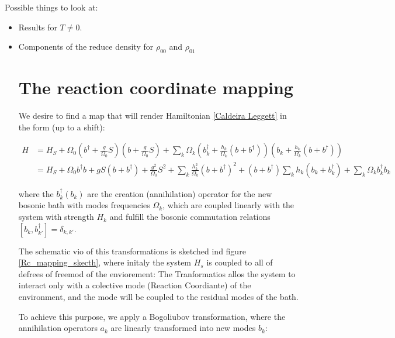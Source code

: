 \documentclass[%
preprint,
onecolumn,
notitlepag,
 amsmath,amssymb,
 aps,
 pra,
]{revtex4-2}
\begin{document}
Possible things to look at:
\begin{itemize}
\item Results for $T \neq 0$. 
\item Components of the reduce density for $\rho_{00}$ and $\rho_{01}$ 


\appendix
\section{The reaction coordinate mapping}
\label{A:RCmap}

We desire to find a map that will render Hamiltonian \eqref{Caldeira Leggett} in the form (up to a shift):

\begin{equation}
\begin{aligned}
H &=H_{S}+\Omega_{0}\left(b^{\dagger}+\frac{g}{\Omega_{0}} S\right)\left(b+\frac{g}{\Omega_{0}} S\right)+\sum_{k} \Omega_{k}\left(b_{k}^{\dagger}+\frac{h_{k}}{\Omega_{k}}\left(b+b^{\dagger}\right)\right)\left(b_{k}+\frac{h_{k}}{\Omega_{k}}\left(b+b^{\dagger}\right)\right) \\
&=H_{S}+\Omega_{0} b^{\dagger} b+g S\left(b+b^{\dagger}\right)+\frac{g^{2}}{\Omega_{0}} S^{2}+\sum_{k} \frac{h_{k}^{2}}{\Omega_{k}}\left(b+b^{\dagger}\right)^{2}+\left(b+b^{\dagger}\right) \sum_{k} h_{k}\left(b_{k}+b_{k}^{\dagger}\right)+\sum_{k} \Omega_{k} b_{k}^{\dagger} b_{k}
\end{aligned}
\label{H tranform}
\end{equation}


where  the $b_k^{\dagger} (b_k)$ are the  creation (annihilation) operator for the new bosonic bath with modes frequencies $\Omega_k$, which are coupled linearly with the  system with strength $H_k$ and fulfill the bosonic commutation relations $ [ b_k , b_{k'}^{\dagger} ] = \delta_{k,k'}  $. 

The schematic vio of this transformations is sketched ind figure \ref{Rc_mapping_skecth}, where initaly  the system $H_s$  is coupled to all of defrees of freemod of the enviorement: The Tranformatios allos the system to interact only with a colective mode (Reaction Coordiante) of the environment, and the mode will be coupled to the residual modes of the bath.

To achieve this purpose, we apply a Bogoliubov transformation, where the annihilation operators $a_k$ are linearly transformed into  new modes $b_k$: 



\end{itemize}
\end{document}
